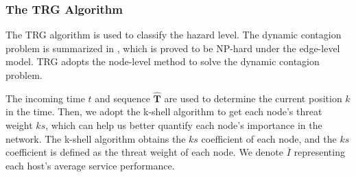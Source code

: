 \documentclass[lettersize,journal]{IEEEtran}
\begin{document}
\subsubsection{The TRG Algorithm}
The TRG algorithm is used to classify the hazard level. The dynamic contagion problem is summarized in \cite{zino2021analysis}, which is proved to be NP-hard under the edge-level model. TRG adopts the node-level method to solve the dynamic contagion problem. \par
The incoming time $t$ and sequence $\hat{\bm{T}}$ are used to determine the current position $k$ in the time. Then, we adopt the k-shell algorithm to get each node's threat weight $ks$, which can help us better quantify each node's importance in the network. The k-shell algorithm obtains the $ks$ coefficient of each node, and the $ks$ coefficient is defined as the threat weight of each node. We denote $\overline{I}$ representing each host's average service performance.\par
 
\end{document}
